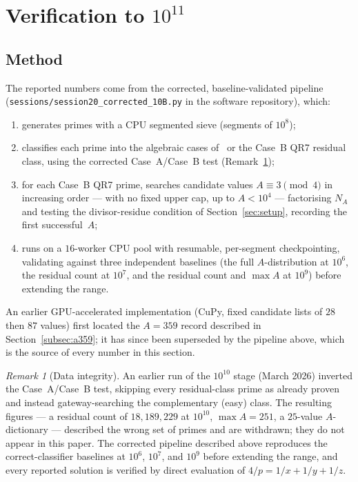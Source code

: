 \documentclass[12pt]{amsart}
\theoremstyle{definition}
\theoremstyle{remark}
\newtheorem{remark}[theorem]{Remark}
\begin{document}
\section{Verification to $10^{11}$}\label{sec:computation}

\subsection{Method}

The reported numbers come from the corrected, baseline-validated
pipeline (\texttt{sessions/session20\_corrected\_10B.py} in the software
repository), which:
\begin{enumerate}
  \item generates primes with a CPU segmented sieve (segments of $10^8$);
  \item classifies each prime into the algebraic cases of~\cite{ES-paper}
    or the Case~B QR7 residual class, using the corrected Case~A/Case~B
    test (Remark~\ref{rem:integrity});
  \item for each Case~B QR7 prime, searches candidate values
    $A \equiv 3 \pmod 4$ in increasing order --- with no fixed upper cap,
    up to $A < 10^4$ --- factorising $N_A$ and testing the
    divisor-residue condition of Section~\ref{sec:setup}, recording the
    first successful~$A$;
  \item runs on a $16$-worker CPU pool with resumable, per-segment
    checkpointing, validating against three independent baselines (the
    full $A$-distribution at $10^6$, the residual count at $10^7$, and
    the residual count and $\max A$ at $10^9$) before extending the
    range.
\end{enumerate}
An earlier GPU-accelerated implementation (CuPy, fixed candidate lists
of $28$ then $87$ values) first located the $A = 359$ record described
in Section~\ref{subsec:a359}; it has since been superseded by the
pipeline above, which is the source of every number in this section.

\begin{remark}[Data integrity]\label{rem:integrity}
An earlier run of the $10^{10}$ stage (March 2026) inverted the
Case~A/Case~B test, skipping every residual-class prime as already
proven and instead gateway-searching the complementary (easy) class.
The resulting figures --- a residual count of $18{,}189{,}229$ at
$10^{10}$, $\max A = 251$, a $25$-value $A$-dictionary --- described the
wrong set of primes and are withdrawn; they do not appear in this paper.
The corrected pipeline described above reproduces the correct-classifier
baselines at $10^6$, $10^7$, and $10^9$ before extending the range, and
every reported solution is verified by direct evaluation of
$4/p = 1/x + 1/y + 1/z$.
\end{remark}
\end{document}
